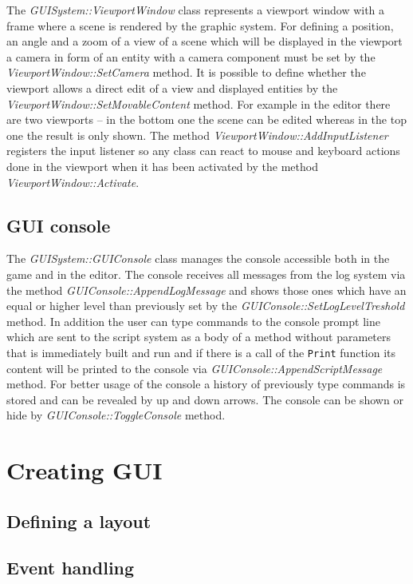 The \emph{GUISystem::ViewportWindow} class represents a viewport window with a frame where a scene is rendered by the graphic system. For defining a position, an angle and a zoom of a view of a scene which will be displayed in the viewport a camera in form of an entity with a camera component must be set by the \emph{ViewportWindow::SetCamera} method. It is possible to define whether the viewport allows a direct edit of a view and displayed entities by the \emph{ViewportWindow::SetMovableContent} method. For example in the editor there are two viewports -- in the bottom one the scene can be edited whereas in the top one the result is only shown. The method \emph{ViewportWindow::AddInputListener} registers the input listener so any class can react to mouse and keyboard actions done in the viewport when it has been activated by the method \emph{ViewportWindow::Activate}.

\subsection{GUI console}
\label{sec:gui-console}

The \emph{GUISystem::GUIConsole} class manages the console accessible both in the game and in the editor. The console receives all messages from the log system via the method \emph{GUIConsole::AppendLogMessage} and shows those ones which have an equal or higher level than previously set by the \emph{GUIConsole::SetLogLevelTreshold} method. In addition the user can type commands to the console prompt line which are sent to the script system as a body of a method without parameters that is immediately built and run and if there is a call of the \verb/Print/ function its content will be printed to the console via \emph{GUIConsole::AppendScriptMessage} method. For better usage of the console a history of previously type commands is stored and can be revealed by up and down arrows. The console can be shown or hide by \emph{GUIConsole::ToggleConsole} method.

\section{Creating GUI}
\label{sec:gui-creating}

\subsection{Defining a layout}

\subsection{Event handling}

